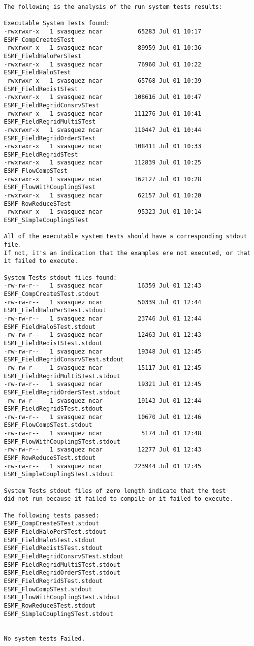 \begin{verbatim}
The following is the analysis of the run system tests results:

Executable System Tests found:
-rwxrwxr-x   1 svasquez ncar          65283 Jul 01 10:17 ESMF_CompCreateSTest
-rwxrwxr-x   1 svasquez ncar          89959 Jul 01 10:36 ESMF_FieldHaloPerSTest
-rwxrwxr-x   1 svasquez ncar          76960 Jul 01 10:22 ESMF_FieldHaloSTest
-rwxrwxr-x   1 svasquez ncar          65768 Jul 01 10:39 ESMF_FieldRedistSTest
-rwxrwxr-x   1 svasquez ncar         108616 Jul 01 10:47 ESMF_FieldRegridConsrvSTest
-rwxrwxr-x   1 svasquez ncar         111276 Jul 01 10:41 ESMF_FieldRegridMultiSTest
-rwxrwxr-x   1 svasquez ncar         110447 Jul 01 10:44 ESMF_FieldRegridOrderSTest
-rwxrwxr-x   1 svasquez ncar         108411 Jul 01 10:33 ESMF_FieldRegridSTest
-rwxrwxr-x   1 svasquez ncar         112839 Jul 01 10:25 ESMF_FlowCompSTest
-rwxrwxr-x   1 svasquez ncar         162127 Jul 01 10:28 ESMF_FlowWithCouplingSTest
-rwxrwxr-x   1 svasquez ncar          62157 Jul 01 10:20 ESMF_RowReduceSTest
-rwxrwxr-x   1 svasquez ncar          95323 Jul 01 10:14 ESMF_SimpleCouplingSTest

All of the executable system tests should have a corresponding stdout file.
If not, it's an indication that the examples ere not executed, or that it failed to execute.

System Tests stdout files found: 
-rw-rw-r--   1 svasquez ncar          16359 Jul 01 12:43 ESMF_CompCreateSTest.stdout
-rw-rw-r--   1 svasquez ncar          50339 Jul 01 12:44 ESMF_FieldHaloPerSTest.stdout
-rw-rw-r--   1 svasquez ncar          23746 Jul 01 12:44 ESMF_FieldHaloSTest.stdout
-rw-rw-r--   1 svasquez ncar          12463 Jul 01 12:43 ESMF_FieldRedistSTest.stdout
-rw-rw-r--   1 svasquez ncar          19348 Jul 01 12:45 ESMF_FieldRegridConsrvSTest.stdout
-rw-rw-r--   1 svasquez ncar          15117 Jul 01 12:45 ESMF_FieldRegridMultiSTest.stdout
-rw-rw-r--   1 svasquez ncar          19321 Jul 01 12:45 ESMF_FieldRegridOrderSTest.stdout
-rw-rw-r--   1 svasquez ncar          19143 Jul 01 12:44 ESMF_FieldRegridSTest.stdout
-rw-rw-r--   1 svasquez ncar          10670 Jul 01 12:46 ESMF_FlowCompSTest.stdout
-rw-rw-r--   1 svasquez ncar           5174 Jul 01 12:48 ESMF_FlowWithCouplingSTest.stdout
-rw-rw-r--   1 svasquez ncar          12277 Jul 01 12:43 ESMF_RowReduceSTest.stdout
-rw-rw-r--   1 svasquez ncar         223944 Jul 01 12:45 ESMF_SimpleCouplingSTest.stdout

System Tests stdout files of zero length indicate that the test
did not run because it failed to compile or it failed to execute. 

The following tests passed: 
ESMF_CompCreateSTest.stdout
ESMF_FieldHaloPerSTest.stdout
ESMF_FieldHaloSTest.stdout
ESMF_FieldRedistSTest.stdout
ESMF_FieldRegridConsrvSTest.stdout
ESMF_FieldRegridMultiSTest.stdout
ESMF_FieldRegridOrderSTest.stdout
ESMF_FieldRegridSTest.stdout
ESMF_FlowCompSTest.stdout
ESMF_FlowWithCouplingSTest.stdout
ESMF_RowReduceSTest.stdout
ESMF_SimpleCouplingSTest.stdout


No system tests Failed.

\end{verbatim}

